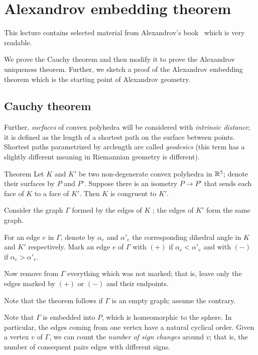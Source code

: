 \chapter{Alexandrov embedding theorem}

This lecture contains selected material from Alexandrov's book~\cite{alexandrov} which is very readable.

We prove the Cauchy theorem and then modify it to prove the Alexandrov uniqueness theorem.
Further, we sketch a proof of the Alexandrov embedding theorem which is the starting point of Alexandrov geometry.


\section{Cauchy theorem}

Further, \emph{surfaces} of convex polyhedra will be considered with \emph{intrinsic distance}; it is defined as the length of a shortest path on the surface between points.
Shortest paths parametrized by arclength are called \emph{geodesics} (this term has a slightly different meaning in Riemannian geometry is different).
 
\begin{thm}{Theorem}\label{thm:cauchy} Let $K$ and $K'$ be two non-degenerate convex polyhedra in $\mathbb{R}^3$;
denote their surfaces 
by $P$ and $P'$.
Suppose there is an isometry $P\to P'$ that sends each face of $K$ to a face of $K'$.
Then $K$ is congruent to $K'$.
\end{thm}

Consider the graph $\Gamma$ formed by the edges of $K$ ;
the edges of $K'$ form the same graph.
 
For an edge $e$ in $\Gamma$, denote by $\alpha_e$ and $\alpha'_e$ the corresponding dihedral angle in $K$ and $K'$ respectively.
Mark an edge $e$ of $\Gamma$ with 
$({+})$ if $\alpha_e < \alpha'_e$ and with $({-})$ if $\alpha_e > \alpha'_e$.

Now remove from $\Gamma$ everything which was not marked;
that is, leave only the edges marked by $(+)$ or $(-)$ and their endpoints.

Note that the theorem follows if $\Gamma$ is an empty graph;
assume the contrary.

Note that $\Gamma$ is embedded into $P$, which is homeomorphic to the sphere.
In particular, the edges coming from one vertex have a natural cyclical order. 
Given a vertex $v$ of $\Gamma$, we can count the \emph{number of sign changes} around $v$;
that is, the number of consequent pairs edges with different signs. 

